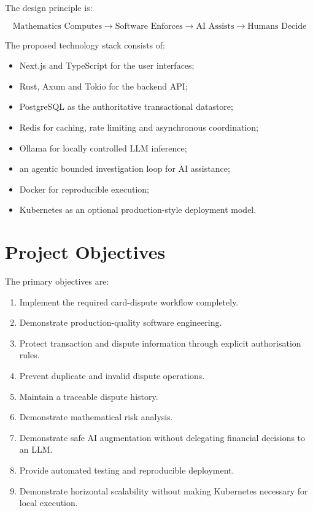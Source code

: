 \documentclass[11pt,a4paper]{article}
\begin{document}
The design principle is:

\[
\boxed{
\text{Mathematics Computes}
\rightarrow
\text{Software Enforces}
\rightarrow
\text{AI Assists}
\rightarrow
\text{Humans Decide}
}
\]

The proposed technology stack consists of:

\begin{itemize}
    \item Next.js and TypeScript for the user interfaces;
    \item Rust, Axum and Tokio for the backend API;
    \item PostgreSQL as the authoritative transactional datastore;
    \item Redis for caching, rate limiting and asynchronous coordination;
    \item Ollama for locally controlled LLM inference;
    \item an agentic bounded investigation loop for AI assistance;
    \item Docker for reproducible execution;
    \item Kubernetes as an optional production-style deployment model.
\end{itemize}

\section{Project Objectives}

The primary objectives are:

\begin{enumerate}
    \item Implement the required card-dispute workflow completely.
    \item Demonstrate production-quality software engineering.
    \item Protect transaction and dispute information through explicit
          authorisation rules.
    \item Prevent duplicate and invalid dispute operations.
    \item Maintain a traceable dispute history.
    \item Demonstrate mathematical risk analysis.
    \item Demonstrate safe AI augmentation without delegating financial
          decisions to an LLM.
    \item Provide automated testing and reproducible deployment.
    \item Demonstrate horizontal scalability without making Kubernetes
          necessary for local execution.
\end{enumerate}
\end{document}
